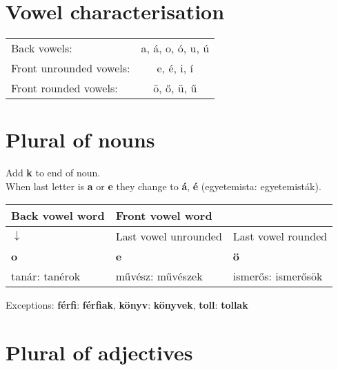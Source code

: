 \documentclass{article}
\begin{document}
\section{Vowel characterisation}

\begin{tabularx}{\textwidth} { X c } \toprule
	Back vowels: & a, á, o, ó, u, ú  \\
	Front unrounded vowels: & e, é, i, í­ \\
	Front rounded vowels: & ö, ő, ü, ű \\ \bottomrule
\end{tabularx}
		


\section{Plural of nouns}
Add \textbf{k} to end of noun.  \\
When last letter is \textbf{a} or \textbf{e} they change to \textbf{á}, \textbf{é} (egyetemista: egyetemisták). \\
\begin{tabularx} {\textwidth}{ X X l } \toprule
	Back vowel word & Front vowel word & \\ \midrule
	 $\downarrow$ & Last vowel unrounded & Last vowel rounded \\
	\textbf{o} & \textbf{e} & \textbf{ö} \\ \midrule
	tanár: tanérok & művész: művészek & ismerős: ismerősök \\ \bottomrule
\end{tabularx}
Exceptions: \textbf{férfi}: \textbf{férfiak}, \textbf{könyv}: \textbf{könyvek}, \textbf{toll}: \textbf{tollak}

\section{Plural of adjectives}
\end{document}

